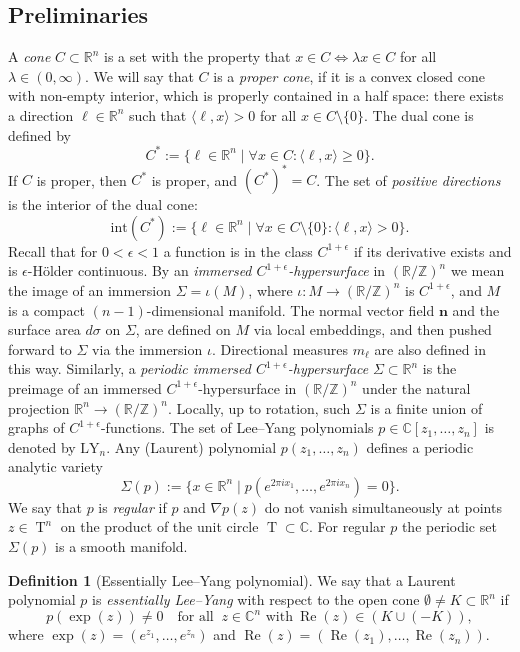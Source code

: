 \documentclass[11pt,letterpaper]{amsart}
\theoremstyle{definition}
\newtheorem{Def}{Definition}[section]
\theoremstyle{plain}
\newcommand{\nfield}{\mathbf n}
\newcommand{\Rea}{\operatorname{Re}}
\newcommand{\T}{\operatorname{T}}
\newcommand{\C}{{\mathbb C}}
\newcommand{\R}{{\mathbb R}}
\newcommand{\Z}{{\mathbb Z}}
\begin{document}
\subsection{Preliminaries} A \emph{cone} $C\subset \mathbb{R}^n$ is a set with the property that $x\in C\iff \lambda x\in C$ for all $\lambda\in (0,\infty)$. We will say that $C$ is a \emph{proper cone}, if it is a convex closed cone with non-empty interior, which is properly contained in a half space: there exists a  direction $\ell\in \mathbb{R}^n$ such that $\langle \ell,x\rangle>0$ for all $x\in C\setminus\{0\}$. The dual cone is defined by 
\[C^*:= \{\ell\in\mathbb{R}^n\mid\forall x\in C:\langle\ell,x\rangle
\ge0\}.\]
If $C$ is proper, then $C^*$ is proper, and $(C^*)^*=C$.
The set of \emph{positive directions} is the interior of the dual cone:
\[\mathrm{int}(C^*):= \{\ell\in\mathbb{R}^n\mid\forall x\in C\setminus\{0\}:\langle\ell,x\rangle>0\}.\]
Recall that for $0<\epsilon<1$ a function is in the class $C^{1+\epsilon}$ if its derivative exists and is $\epsilon$-H\"older continuous. By an \emph{immersed $C^{1+\epsilon}$-hypersurface} in $(\R/\Z)^n$ we mean the image of an immersion $\Sigma=\iota(M)$, where $\iota:M\to(\R/\Z)^n$ is $C^{1+\epsilon}$, and $M$ is a compact $(n-1)$-dimensional manifold. The normal vector field $\nfield$ and the surface area $d\sigma$ on $\Sigma$, are defined on $M$ via local embeddings, and then pushed forward to $\Sigma$ via the immersion $\iota$. Directional measures $m_{\ell}$ are also defined in this way. 
Similarly, a \emph{periodic immersed $C^{1+\epsilon}$-hypersurface} $\Sigma\subset\R^n$ is the preimage of an immersed $C^{1+\epsilon}$-hypersurface in $(\R/\Z)^n$ under the natural projection $\R^n\to(\R/\Z)^n$.
 Locally, up to rotation, such $\Sigma$ is a finite union of graphs of $C^{1+\epsilon}$-functions.  The set of Lee--Yang polynomials $p\in\C[z_1,\ldots,z_n]$ is denoted by $\mathrm{LY}_{n}$.
Any (Laurent) polynomial $p(z_1,\ldots,z_{n})$ defines a periodic analytic variety  
\begin{equation}\label{Sigma(p)}
    \Sigma(p):=\{x\in\R^n\mid p(e^{2\pi i x_{1}},\ldots,e^{2\pi i x_{n}})=0 \}.
\end{equation}
We say that $p$ is \emph{regular} if $p$ and $\nabla p(z)$ do not vanish simultaneously at points $z\in\T^n$ on the product of the unit circle $\T\subset\C$. For regular $p$ the periodic set $\Sigma(p)$ is a smooth manifold.
\begin{Def}[Essentially Lee--Yang polynomial]\label{def: ess LY}
We say that a Laurent polynomial $p$ is \emph{essentially Lee--Yang} with respect to the open cone $\emptyset\neq K \subset \mathbb{R}^n$ if
\[
p(\exp(z)) \neq 0 \quad \text{for all \ }\   z \in \mathbb{C}^n \text{ with}\ \Rea (z)\in\left( K \cup (-K)\right),
\]
where $\exp(z)=(e^{z_1},\ldots,e^{z_n})$ and $\Rea (z)=(\Rea( z_1),\ldots,\Rea( z_n))$.
\end{Def}
\end{document}
